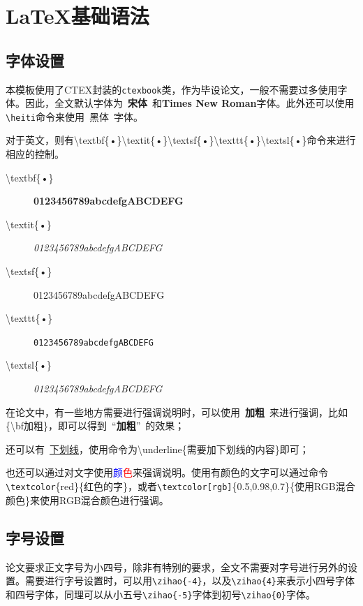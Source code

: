 \chapter{\label{chapter-yufa}\LaTeX{}基础语法}
\section{字体设置}
本模板使用了CTEX封装的\texttt{ctexbook}类，作为毕设论文，一般不需要过多使用字体。因此，全文默认字体为~{\bf 宋体}~和{\bf Times New Roman}字体。此外还可以使用\texttt{\textbackslash heiti}命令来使用~{\heiti 黑体}~字体。\par
对于英文，则有\textbackslash textbf\{•\}\quad\textbackslash textit\{•\}\quad\textbackslash textsf\{•\}\quad\textbackslash texttt\{•\}\quad\textbackslash textsl\{•\}命令来进行相应的控制。\par
\begin{description}
    \item[\textbackslash textbf\{•\}] \textbf{0123456789abcdefgABCDEFG}
    \item[\textbackslash textit\{•\}] \textit{0123456789abcdefgABCDEFG}
    \item[\textbackslash textsf\{•\}] \textsf{0123456789abcdefgABCDEFG}
    \item[\textbackslash texttt\{•\}] \texttt{0123456789abcdefgABCDEFG}
    \item[\textbackslash textsl\{•\}] \textsl{0123456789abcdefgABCDEFG}
\end{description}
在论文中，有一些地方需要进行强调说明时，可以使用~{\bf 加粗}~来进行强调，比如\{\textbackslash bf加粗\}，即可以得到~“{\bf 加粗}”~的效果；\par
还可以有~\underline{下划线}，使用命令为\textbackslash underline\{需要加下划线的内容\}即可；\par
也还可以通过对文字使用\textcolor{blue}{颜}\textcolor{red}{色}来强调说明。使用\textcolor[rgb]{0.5,0.95,0.96}{有颜色的文字}可以通过命令\texttt{\textbackslash textcolor}\{red\}\{红色的字\}，或者\texttt{\textbackslash textcolor[rgb]}\{0.5,0.98,0.7\}\{使用RGB混合颜色\}来\textcolor[rgb]{0.5,0.98,0.7}{使用RGB混合颜色}进行强调。
\section{字号设置}
论文要求正文字号为小四号，除非有特别的要求，全文不需要对字号进行另外的设置。需要进行字号设置时，可以用\texttt{\textbackslash zihao\{-4\}}，以及\texttt{\textbackslash zihao\{4\}}来表示小四号字体和四号字体，同理可以从小五号\texttt{\textbackslash zihao\{-5\}}字体到初号\texttt{\textbackslash zihao\{0\}}字体。\par
